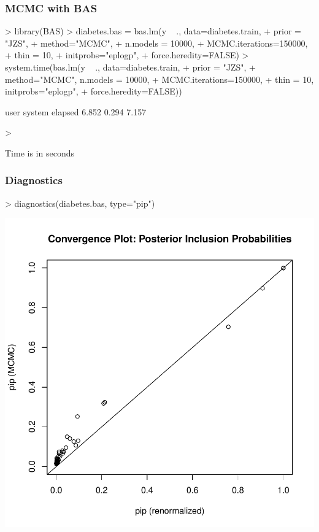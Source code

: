 \documentclass[]{beamer}
\begin{document}
\begin{frame}[fragile]\frametitle{MCMC with BAS}
\begin{Schunk}
\begin{Sinput}
> library(BAS)
> diabetes.bas = bas.lm(y ~ ., data=diabetes.train,
+                       prior = "JZS",
+                       method="MCMC",
+                       n.models = 10000,
+                       MCMC.iterations=150000,
+                       thin = 10,
+                       initprobs="eplogp",
+                       force.heredity=FALSE)
> system.time(bas.lm(y ~ ., data=diabetes.train, 
+                    prior = "JZS",
+                    method="MCMC", n.models = 10000,
+                    MCMC.iterations=150000,
+                    thin = 10,  initprobs="eplogp",
+                    force.heredity=FALSE))
\end{Sinput}
\begin{Soutput}
   user  system elapsed 
  6.852   0.294   7.157 
\end{Soutput}
\begin{Sinput}
> 
\end{Sinput}
\end{Schunk}

Time is in seconds

\end{frame}



\begin{frame}[fragile] \frametitle{Diagnostics}

\begin{Schunk}
\begin{Sinput}
> diagnostics(diabetes.bas, type="pip")
\end{Sinput}
\end{Schunk}
\includegraphics{17-bma-diagnostics}

\end{frame}
\end{document}
